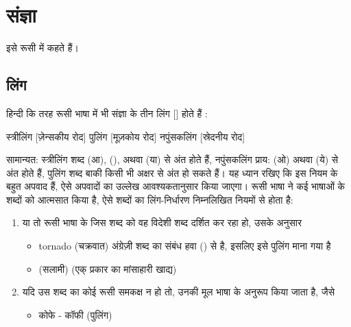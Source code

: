 \chapter{संज्ञा}\label{ch: noun}
इसे रूसी में  कहते हैं।

\section{लिंग}\label{sec:noun-gender}
हिन्दी कि तरह रूसी भाषा में भी संज्ञा के तीन लिंग []  होते हैं :

स्त्रीलिंग   [ज़ेन्सकीय रोद]
पुलिंग  [मूज़कोय रोद]
नपुंसकलिंग  [स्रेदनीय रोद]

सामान्यत: स्त्रीलिंग शब्द  (आ),  (),  अथवा  (या)  से अंत होते हैं, नपुंसकलिंग प्राय:  (ओ) अथवा
 (ये) से अंत होते हैं, पुलिंग शब्द बाकी किसी भी अक्षर से अंत हो सकते हैं। यह ध्यान रखिए कि इस नियम के बहुत अपवाद हैं, ऐसे अपवादों का उल्लेख
आवश्यकतानुसार किया जाएगा। रूसी भाषा ने कई भाषाओं के शब्दों को आत्मसात किया है, ऐसे शब्दों का लिंग-निर्धारण निम्नलिखित नियमों से होता है:
\begin{enumerate}
    \item या तो रूसी भाषा के जिस शब्द को वह विदेशी शब्द दर्शित कर रहा हो, उसके अनुसार
    \begin{itemize}
        \item tornado (चक्रवात) अंग्रेज़ी शब्द का संबंध हवा () से है, इसलिए इसे पुलिंग माना गया है
        \item (सलामी) (एक् प्रकार का मांसाहारी खाद्य)
    \end{itemize}
    \item  यदि उस शब्द का कोई रूसी समकक्ष न हो तो, उनकी मूल भाषा के अनुरूप किया जाता है, जैसे
    \begin{itemize}
        \item कोफे - कॉफी (पुलिंग)
    \end{itemize}
\end{enumerate}





